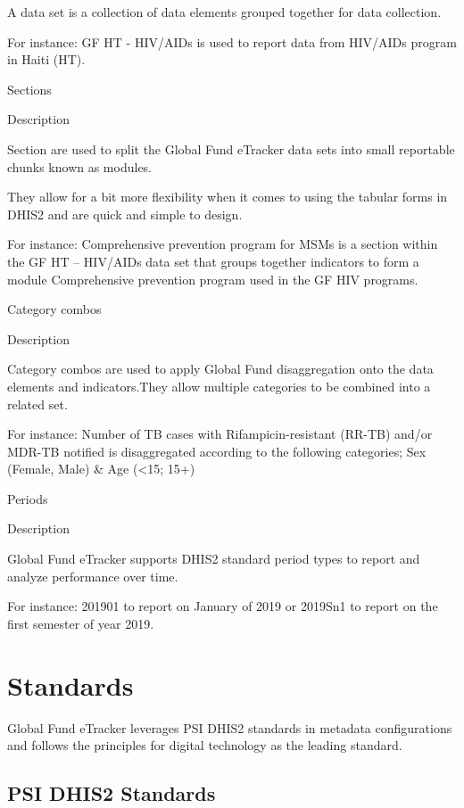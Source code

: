 \documentclass[]{book}
\begin{document}
A data set is a collection of data elements grouped together for data collection.

For instance: GF HT - HIV/AIDs is used to report data from HIV/AIDs program in Haiti (HT).

Sections

Description

Section are used to split the Global Fund eTracker data sets into small reportable chunks known as modules.

They allow for a bit more flexibility when it comes to using the tabular forms in DHIS2 and are quick and simple to design.

For instance: Comprehensive prevention program for MSMs is a section within the GF HT -- HIV/AIDs data set that groups together indicators to form a module Comprehensive prevention program used in the GF HIV programs.

Category combos

Description

Category combos are used to apply Global Fund disaggregation onto the data elements and indicators.They allow multiple categories to be combined into a related set.

For instance: Number of TB cases with Rifampicin-resistant (RR-TB) and/or MDR-TB notified is disaggregated according to the following categories; Sex (Female, Male) \& Age (\textless{}15; 15+)

Periods

Description

Global Fund eTracker supports DHIS2 standard period types to report and analyze performance over time.

For instance: 201901 to report on January of 2019 or 2019Sn1 to report on the first semester of year 2019.

\hypertarget{standards}{%
\section{Standards}\label{standards}}

Global Fund eTracker leverages PSI DHIS2 standards in metadata configurations and follows the principles for digital technology as the leading standard.

\hypertarget{psi-dhis2-standards}{%
\subsection{PSI DHIS2 Standards}\label{psi-dhis2-standards}}
\end{document}

